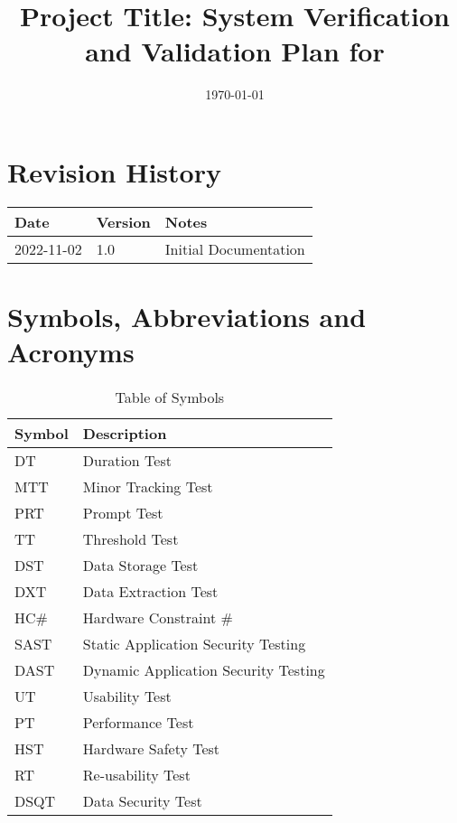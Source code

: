 \documentclass[12pt, titlepage]{article}
\begin{document}
\title{Project Title: System Verification and Validation Plan for \progname{}}
\author{\authname}
\date{\today}

\maketitle


\section{Revision History}

\begin{tabularx}{\textwidth}{p{3cm}p{2cm}X}

  \toprule {\bf Date} & {\bf Version} & {\bf Notes}           \\
  \midrule
  2022-11-02          & 1.0           & Initial Documentation \\
  \bottomrule
\end{tabularx}

\newpage

\tableofcontents

\listoftables
\newpage

\section{Symbols, Abbreviations and Acronyms}
\renewcommand{\arraystretch}{1.2}

\begin{table}[H]
	\begin{tabular}{l l} 
		  \toprule		
			  \textbf{Symbol} & \textbf{Description}\\
			  \midrule 
			  DT 						& Duration Test\\
			  MTT 					& Minor Tracking Test\\
			  PRT 					& Prompt Test\\
			  TT 						& Threshold Test\\
			  DST 					& Data Storage Test\\
			  DXT 					& Data Extraction Test\\
			  HC\#					& Hardware Constraint \#\\ 
			  SAST					& Static Application Security Testing\\			
			  DAST					& Dynamic Application Security Testing\\
			  UT						& Usability Test\\
			  PT						& Performance Test\\
			  HST					& Hardware Safety Test\\
			  RT						& Re-usability Test\\
			  DSQT					& Data Security Test\\
		  \bottomrule
	\end{tabular}\\\\
\caption{\label{Syb}Table of Symbols}
\end{table}
\end{document}
